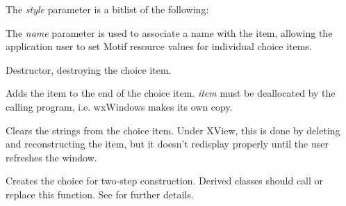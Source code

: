 The {\it style} parameter is a bitlist of the following:

\begin{twocollist}\itemsep=0pt
\end{twocollist}

The {\it name} parameter is used to associate a name with the item,
allowing the application user to set Motif resource values for
individual choice items.



Destructor, destroying the choice item.



Adds the item to the end of the choice item. {\it item} must be
deallocated by the calling program, i.e. wxWindows makes its own copy.



Clears the strings from the choice item. Under XView, this is done
by deleting and reconstructing the item, but it doesn't redisplay
properly until the user refreshes the window.



Creates the choice for two-step construction. Derived classes
should call or replace this function. See \rtfsp
for further details.



